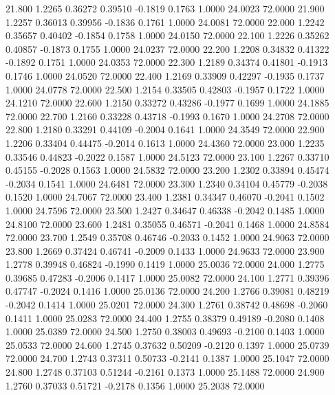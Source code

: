   21.800   1.2265   0.36272   0.39510  -0.1819   0.1763   1.0000  24.0023  72.0000
  21.900   1.2257   0.36013   0.39956  -0.1836   0.1761   1.0000  24.0081  72.0000
  22.000   1.2242   0.35657   0.40402  -0.1854   0.1758   1.0000  24.0150  72.0000
  22.100   1.2226   0.35262   0.40857  -0.1873   0.1755   1.0000  24.0237  72.0000
  22.200   1.2208   0.34832   0.41322  -0.1892   0.1751   1.0000  24.0353  72.0000
  22.300   1.2189   0.34374   0.41801  -0.1913   0.1746   1.0000  24.0520  72.0000
  22.400   1.2169   0.33909   0.42297  -0.1935   0.1737   1.0000  24.0778  72.0000
  22.500   1.2154   0.33505   0.42803  -0.1957   0.1722   1.0000  24.1210  72.0000
  22.600   1.2150   0.33272   0.43286  -0.1977   0.1699   1.0000  24.1885  72.0000
  22.700   1.2160   0.33228   0.43718  -0.1993   0.1670   1.0000  24.2708  72.0000
  22.800   1.2180   0.33291   0.44109  -0.2004   0.1641   1.0000  24.3549  72.0000
  22.900   1.2206   0.33404   0.44475  -0.2014   0.1613   1.0000  24.4360  72.0000
  23.000   1.2235   0.33546   0.44823  -0.2022   0.1587   1.0000  24.5123  72.0000
  23.100   1.2267   0.33710   0.45155  -0.2028   0.1563   1.0000  24.5832  72.0000
  23.200   1.2302   0.33894   0.45474  -0.2034   0.1541   1.0000  24.6481  72.0000
  23.300   1.2340   0.34104   0.45779  -0.2038   0.1520   1.0000  24.7067  72.0000
  23.400   1.2381   0.34347   0.46070  -0.2041   0.1502   1.0000  24.7596  72.0000
  23.500   1.2427   0.34647   0.46338  -0.2042   0.1485   1.0000  24.8100  72.0000
  23.600   1.2481   0.35055   0.46571  -0.2041   0.1468   1.0000  24.8584  72.0000
  23.700   1.2549   0.35708   0.46746  -0.2033   0.1452   1.0000  24.9063  72.0000
  23.800   1.2669   0.37424   0.46741  -0.2009   0.1433   1.0000  24.9633  72.0000
  23.900   1.2778   0.39948   0.46824  -0.1990   0.1419   1.0000  25.0036  72.0000
  24.000   1.2775   0.39685   0.47283  -0.2006   0.1417   1.0000  25.0082  72.0000
  24.100   1.2771   0.39396   0.47747  -0.2024   0.1416   1.0000  25.0136  72.0000
  24.200   1.2766   0.39081   0.48219  -0.2042   0.1414   1.0000  25.0201  72.0000
  24.300   1.2761   0.38742   0.48698  -0.2060   0.1411   1.0000  25.0283  72.0000
  24.400   1.2755   0.38379   0.49189  -0.2080   0.1408   1.0000  25.0389  72.0000
  24.500   1.2750   0.38003   0.49693  -0.2100   0.1403   1.0000  25.0533  72.0000
  24.600   1.2745   0.37632   0.50209  -0.2120   0.1397   1.0000  25.0739  72.0000
  24.700   1.2743   0.37311   0.50733  -0.2141   0.1387   1.0000  25.1047  72.0000
  24.800   1.2748   0.37103   0.51244  -0.2161   0.1373   1.0000  25.1488  72.0000
  24.900   1.2760   0.37033   0.51721  -0.2178   0.1356   1.0000  25.2038  72.0000
